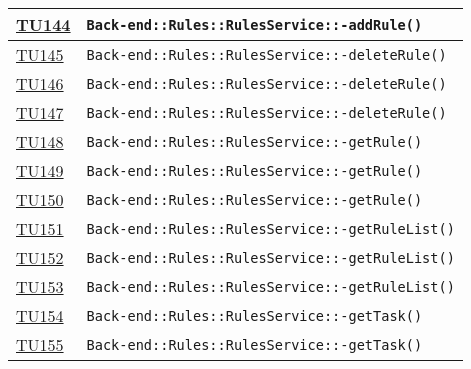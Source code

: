 \begin{longtable}{|>{\centering}m{1cm}|m{12cm}<{\centering}|}
\hyperlink{TU144}{TU144} & \texttt{Back-end::Rules::RulesService::-\linebreak addRule()}\\ \hline

\hyperlink{TU145}{TU145} & \texttt{Back-end::Rules::RulesService::-\linebreak deleteRule()}\\ \hline

\hyperlink{TU146}{TU146} & \texttt{Back-end::Rules::RulesService::-\linebreak deleteRule()}\\ \hline

\hyperlink{TU147}{TU147} & \texttt{Back-end::Rules::RulesService::-\linebreak deleteRule()}\\ \hline

\hyperlink{TU148}{TU148} & \texttt{Back-end::Rules::RulesService::-\linebreak getRule()}\\ \hline

\hyperlink{TU149}{TU149} & \texttt{Back-end::Rules::RulesService::-\linebreak getRule()}\\ \hline

\hyperlink{TU150}{TU150} & \texttt{Back-end::Rules::RulesService::-\linebreak getRule()}\\ \hline

\hyperlink{TU151}{TU151} & \texttt{Back-end::Rules::RulesService::-\linebreak getRuleList()}\\ \hline

\hyperlink{TU152}{TU152} & \texttt{Back-end::Rules::RulesService::-\linebreak getRuleList()}\\ \hline

\hyperlink{TU153}{TU153} & \texttt{Back-end::Rules::RulesService::-\linebreak getRuleList()}\\ \hline

\hyperlink{TU154}{TU154} & \texttt{Back-end::Rules::RulesService::-\linebreak getTask()}\\ \hline

\hyperlink{TU155}{TU155} & \texttt{Back-end::Rules::RulesService::-\linebreak getTask()}\\ \hline


\end{longtable}
